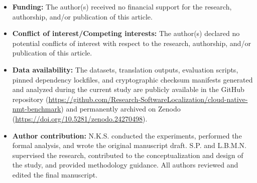 \documentclass[pdflatex,sn-mathphys-num]{sn-jnl}
\begin{document}
\begin{itemize}
\item \textbf{Funding:} The author(s) received no financial support for the research, authorship, and/or publication of this article.
\item \textbf{Conflict of interest/Competing interests:} The author(s) declared no potential conflicts of interest with respect to the research, authorship, and/or publication of this article.
\item \textbf{Data availability:} The datasets, translation outputs, evaluation scripts, pinned dependency lockfiles, and cryptographic checksum manifests generated and analyzed during the current study are publicly available in the GitHub repository (\url{https://github.com/Research-SoftwareLocalization/cloud-native-nmt-benchmark}) and permanently archived on Zenodo (\url{https://doi.org/10.5281/zenodo.24270498}).
\item \textbf{Author contribution:} N.K.S. conducted the experiments, performed the formal analysis, and wrote the original manuscript draft. S.P. and L.B.M.N. supervised the research, contributed to the conceptualization and design of the study, and provided methodology guidance. All authors reviewed and edited the final manuscript.
\end{itemize}
\end{document}
